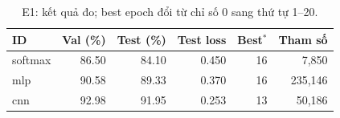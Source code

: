 \begin{table}[htbp]
\centering\small
\caption{E1: kết quả đo; best epoch đổi từ chỉ số 0 sang thứ tự 1--20.}\label{tab:resultsE1}
\begin{lrbox}{\reporttable}\begin{tabular}{lrrrrr}
\toprule
ID & Val (\%) & Test (\%) & Test loss & Best$^*$ & Tham số \\
\midrule
softmax & 86.50 & 84.10 & 0.450 & 16 & 7,850 \\
mlp & 90.58 & 89.33 & 0.370 & 16 & 235,146 \\
cnn & 92.98 & 91.95 & 0.253 & 13 & 50,186 \\
\bottomrule
\end{tabular}\end{lrbox}
\ifdim\wd\reporttable>\linewidth\resizebox{\linewidth}{!}{\usebox{\reporttable}}\else\usebox{\reporttable}\fi
\end{table}
